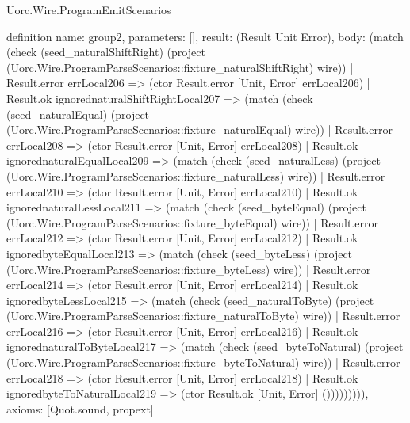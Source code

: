 \begin{lexlean}{Uorc.Wire.ProgramEmitScenarios}
\begin{semanticmodule}
definition{
  name: group2,
  parameters: [],
  result: (Result Unit Error),
  body: (match (check (seed_naturalShiftRight) (project (Uorc.Wire.ProgramParseScenarios::fixture_naturalShiftRight) wire))
    | Result.error errLocal206 => (ctor Result.error [Unit, Error] errLocal206)
    | Result.ok ignorednaturalShiftRightLocal207 => (match (check (seed_naturalEqual) (project (Uorc.Wire.ProgramParseScenarios::fixture_naturalEqual) wire))
      | Result.error errLocal208 => (ctor Result.error [Unit, Error] errLocal208)
      | Result.ok ignorednaturalEqualLocal209 => (match (check (seed_naturalLess) (project (Uorc.Wire.ProgramParseScenarios::fixture_naturalLess) wire))
        | Result.error errLocal210 => (ctor Result.error [Unit, Error] errLocal210)
        | Result.ok ignorednaturalLessLocal211 => (match (check (seed_byteEqual) (project (Uorc.Wire.ProgramParseScenarios::fixture_byteEqual) wire))
          | Result.error errLocal212 => (ctor Result.error [Unit, Error] errLocal212)
          | Result.ok ignoredbyteEqualLocal213 => (match (check (seed_byteLess) (project (Uorc.Wire.ProgramParseScenarios::fixture_byteLess) wire))
            | Result.error errLocal214 => (ctor Result.error [Unit, Error] errLocal214)
            | Result.ok ignoredbyteLessLocal215 => (match (check (seed_naturalToByte) (project (Uorc.Wire.ProgramParseScenarios::fixture_naturalToByte) wire))
              | Result.error errLocal216 => (ctor Result.error [Unit, Error] errLocal216)
              | Result.ok ignorednaturalToByteLocal217 => (match (check (seed_byteToNatural) (project (Uorc.Wire.ProgramParseScenarios::fixture_byteToNatural) wire))
                | Result.error errLocal218 => (ctor Result.error [Unit, Error] errLocal218)
                | Result.ok ignoredbyteToNaturalLocal219 => (ctor Result.ok [Unit, Error] ())))))))),
  axioms: [Quot.sound, propext]
}


\end{semanticmodule}
\end{lexlean}
